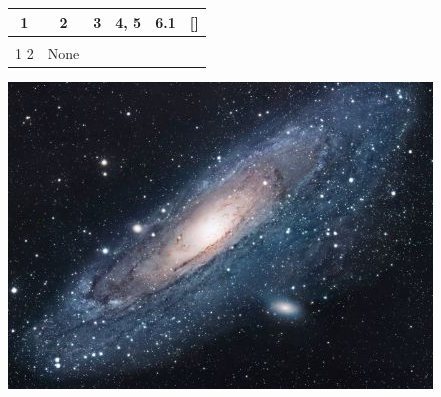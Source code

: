 \documentclass{article}
\begin{document}
\begin{center}
\begin{tabular}{ |c|c|c|c|c|c| }
\hline
1 & 2 & 3 & 4, 5 & 6.1 & [] \\
\hline
 &  &  &  &  &  \\
\hline
1
2 & None &  &  &  &  \\
\hline
\end{tabular}

\includegraphics[scale=1.0]{universe.jpg}
\end{center}
\end{document}
